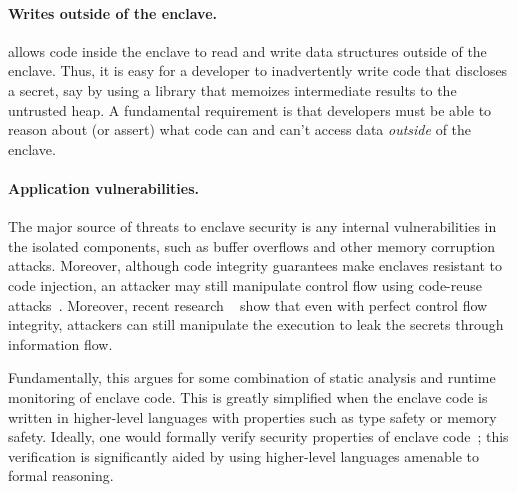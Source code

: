 
\paragraph{Writes outside of the enclave.}
\sgx{} allows code inside the enclave to read and write data structures 
outside of the enclave.  Thus, it is easy for a developer to inadvertently write
code that discloses a secret, say by using a library that memoizes intermediate results to the untrusted heap.
A fundamental requirement is that developers must be able to reason about (or assert)
what code can and can't access data {\em outside} of the enclave.


\paragraph{Application vulnerabilities.} 
The major source of threats to enclave security is any internal vulnerabilities in the isolated components,
such as buffer overflows and other memory corruption attacks.
Moreover, although \sgx{} code integrity guarantees make enclaves resistant to code injection,
an attacker may still manipulate control flow using code-reuse attacks~\cite{code-reuse-attacks}.
Moreover, recent research ~\cite{hudata} show that even with perfect control flow integrity,
attackers can still manipulate the execution to leak the secrets through information flow.

Fundamentally, this argues for some combination of static analysis
and runtime monitoring of 
enclave code.  This is greatly simplified when the enclave code is written in higher-level languages
with properties 
such as type safety or memory safety. %
Ideally, one would formally verify security properties of enclave code~\cite{moat}; this verification is significantly aided by using 
higher-level languages amenable to formal reasoning.

